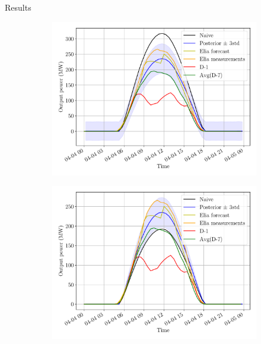 \documentclass[12pt]{beamer}
\begin{document}
\begin{frame}{Results}
    \begin{figure}[H]
	\centering
	\begin{subfigure}{0.48\textwidth}
		\centering
		\includegraphics[width=\textwidth]{resources/pdf/solar_panelwise_START_FOR_04-04-2020.pdf}
	\end{subfigure}
	\hspace{0em}
	\begin{subfigure}{0.48\textwidth}
		\centering
		\includegraphics[width=\textwidth]{resources/pdf/solar_provincial_START_FOR_04-04-2020.pdf}
	\end{subfigure}
\end{figure}
\end{frame}
\end{document}
